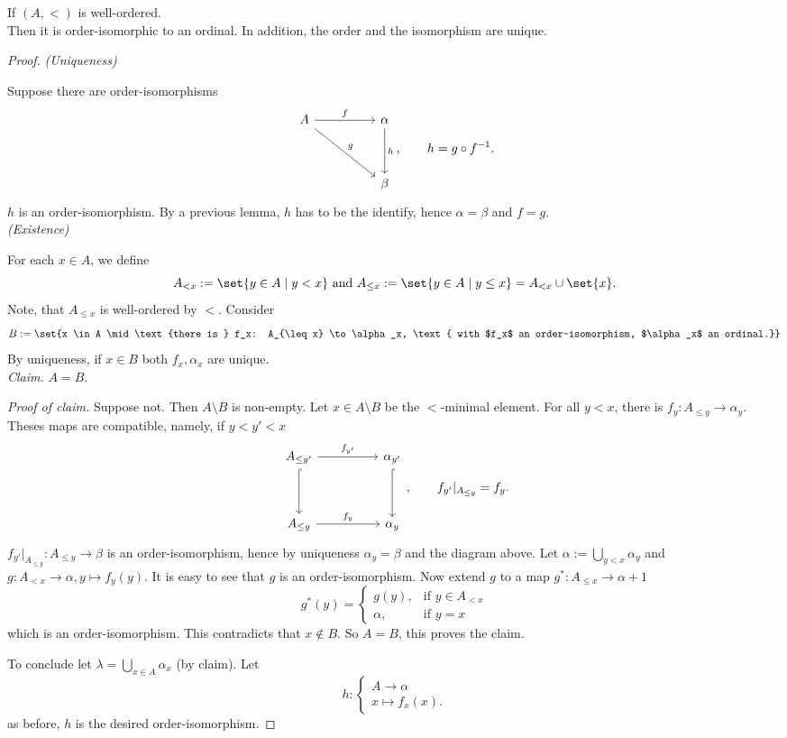 \begin{theorem}
    If $(A, <)$ is well-ordered.\\
    Then it is order-isomorphic to an ordinal. In addition, the order and the isomorphism are unique.
\end{theorem}
\begin{proof}
    \emph{(Uniqueness)}

    Suppose there are order-isomorphisms
    $$\begin{tikzcd}[sep=huge]
        A \arrow[r, "f"] \arrow[dr, "g"] & \alpha \arrow[d, "h"]\\
        & \beta
    \end{tikzcd},\qquad h = g \circ f^{-1}.$$
    $h$ is an order-isomorphism. By a previous lemma, $h$ has to be the identify, hence $\alpha=\beta$ and $f=g$.\\
    \emph{(Existence)}

    For each $x \in A$, we define
    $$ A_{<x} := \set{y \in A \mid y < x} \text{ and } A_{\leq x} := \set{y \in A \mid y \leq x} = A_{<x} \cup \set{x}.$$
    Note, that $A_{\leq x}$ is well-ordered by $<$. 
    Consider
    $$ B := \set{x \in A \mid \text{there is } f_x: A_{\leq x} \to \alpha_x, \text{ with $f_x$ an order-isomorphism, $\alpha_x$ an ordinal.}}$$
    By uniqueness, if $x \in B$ both $f_x, \alpha_x$ are unique.\\
    \emph{Claim.} $A=B$.

    \emph{Proof of claim.} Suppose not. Then $A \setminus B$ is non-empty. Let $x \in A \setminus B$ be the $<$-minimal element.
    For all $y < x$, there is $f_y: A_{\leq y} \to \alpha_y$. Theses maps are compatible, namely, if $y < y' < x$
    $$ \begin{tikzcd}[sep=huge]
        A_{\leq y'} \arrow[r, "f_{y'}"] \arrow[d, hookrightarrow] & \alpha_{y'} \arrow[d, hookrightarrow]\\
        A_{\leq y} \arrow[r, "f_{y}"] & \alpha_y
    \end{tikzcd}, \qquad f_{y'}|_{A_{\leq y}} = f_y. $$
    $f_{y'}|_{A_{\leq y}}:A_{\leq y} \to \beta $ is an order-isomorphism, hence by uniqueness $\alpha_y = \beta$ and the diagram above.
    Let $\alpha:= \bigcup_{y < x} \alpha_y$ and $g: A_{< x} \to \alpha, y \mapsto f_y(y)$. It is easy to see that $g$ is an order-isomorphism.
    Now extend $g$ to a map $g^*: A_{\leq x} \to \alpha + 1$
    $$ g^*(y) = \begin{cases}
        g(y), & \text{if } y \in A_{< x}\\
        \alpha, & \text{if } y=x
    \end{cases}$$
    which is an order-isomorphism. This contradicts that $x \notin B$. So $A=B$, this proves the claim.

    To conclude let $\lambda = \bigcup_{x \in A} \alpha_x$ (by claim). Let 
    $$ h: \begin{cases}
        A \to \alpha\\
        x \mapsto f_x(x).
    \end{cases}$$
    as before, $h$ is the desired order-isomorphism.
\end{proof}

